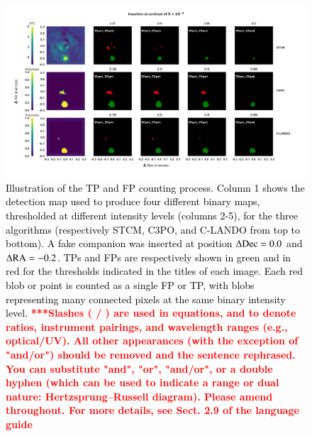 \documentclass{aa}
\newcommand{\newchange}[1]{\textcolor{black}{#1}}
\begin{document}
\begin{figure}[t]
    \centering
    \includegraphics[width=\textwidth]{Fig3_Mar2024_referee.png}
    \caption{\newchange{Illustration of the TP and FP counting process. Column 1 shows the detection map used to produce four different binary maps, thresholded at different intensity levels (columns 2-5), for the three algorithms (respectively STCM, C3PO, and C-LANDO from top to bottom). A fake companion was inserted at position $\Delta{\rm Dec}=0.0$ and $\Delta{\rm RA} = -0.2$. TPs and FPs are respectively shown in green and in red for the thresholds indicated in the titles of each image. Each red blob or point is counted as a single FP or TP, with blobs representing many connected pixels at the same binary intensity level.
    \textcolor{red}{\textbf{***Slashes ( / ) are used in equations, and to denote ratios, instrument pairings, and wavelength ranges (e.g., optical/UV). All other appearances (with the exception of "and/or") should be removed and the sentence rephrased. You can substitute "and", "or", "and/or", or a double hyphen (which can be used to indicate a range or dual nature: Hertzsprung--Russell diagram). Please amend throughout. For more details, see Sect. 2.9 of the language guide }}
    }}
    \label{fig:sample_detmaps}
\end{figure}
\end{document}
